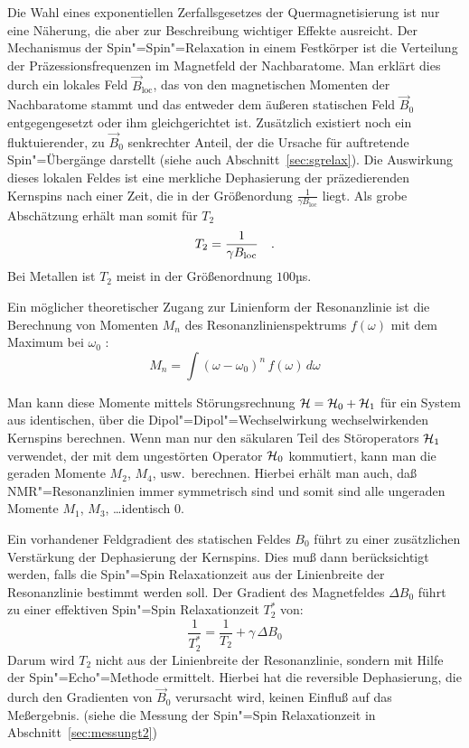 \begin{description}
		Die Wahl eines exponentiellen Zerfallsgesetzes der Quermagnetisierung ist nur eine
		Näherung, die aber zur Beschreibung wichtiger Effekte ausreicht. Der Mechanismus der
		Spin"=Spin"=Relaxation in einem Festkörper ist die Verteilung der Präzessionsfrequenzen im
		Magnetfeld der Nachbaratome. Man erklärt dies durch ein lokales Feld $\vec
		B_\mathrm{loc}$, das von den magnetischen Momenten der Nachbaratome stammt und das
		entweder dem äußeren statischen Feld $\vec B_0$ entgegengesetzt oder ihm gleichgerichtet
		ist. Zusätzlich existiert noch ein fluktuierender, zu $\vec B_0$ senkrechter Anteil, der
		die Ursache für auftretende Spin"=Übergänge darstellt (siehe auch
		Abschnitt~\ref{sec:sgrelax}). Die Auswirkung dieses lokalen Feldes ist eine merkliche
		Dephasierung der präzedierenden Kernspins nach einer Zeit, die in der Größenordung
		$\frac1{\gamma B_\mathrm{loc}}$ liegt. Als grobe Abschätzung erhält man somit für $T_2$
			\begin{equation}
				T_2=\frac1{\gamma B_\mathrm{loc}}\quad\text{.}
			\end{equation}
		Bei Metallen ist $T_2$ meist in der Größenordnung $100µ$s.

		Ein möglicher theoretischer Zugang zur Linienform der Resonanzlinie ist die Berechnung von
		Momenten $M_n$ des Resonanzlinienspektrums $f(\omega)$ mit dem Maximum bei $\omega_0$
		\cite[S. 106ff]{Abragam}:
			\begin{equation}
				M_n = \int(\omega-\omega_0)^n\,f(\omega)\,d\omega
			\end{equation}

Man kann diese Momente mittels Störungsrechnung ${\cal H}={\cal H}_0+{\cal H}_1$ für ein System aus identischen,
über die Dipol"=Dipol"=Wechselwirkung wechselwirkenden Kernspins berechnen. Wenn man nur den
säkularen Teil des Störoperators ${\cal H}_1$ verwendet, der mit dem ungestörten Operator ${\cal H}_0$
kommutiert, kann man die geraden Momente $M_2$, $M_4$, usw.\ berechnen. Hierbei erhält man auch,
daß NMR"=Resonanzlinien immer symmetrisch sind und somit sind alle ungeraden Momente $M_1$, $M_3$,
\ldots identisch 0.

		Ein vorhandener Feldgradient des statischen Feldes $B_0$ führt zu einer zusätzlichen
		Verstärkung der Dephasierung der Kernspins. Dies muß dann
		berücksichtigt werden, falls die Spin"=Spin Relaxationzeit aus der Linienbreite der
		Resonanzlinie bestimmt werden soll. Der Gradient des Magnetfeldes $\Delta B_0$ führt zu
		einer effektiven Spin"=Spin Relaxationzeit $T_2^\ast$ von:
			\begin{equation}
				\label{eqn:t2stern}
				\frac1{T_2^\ast}=\frac1{T_2}+\gamma\,\Delta B_0
			\end{equation}	
		Darum wird $T_2$ nicht aus der Linienbreite der Resonanzlinie, sondern mit Hilfe
		der Spin"=Echo"=Methode ermittelt. Hierbei hat die reversible Dephasierung, die
		durch den Gradienten von $\vec B_0$ verursacht wird, keinen Einfluß auf das Meßergebnis.
		(siehe die Messung der Spin"=Spin Relaxationzeit in Abschnitt~\ref{sec:messungt2})


\end{description}
